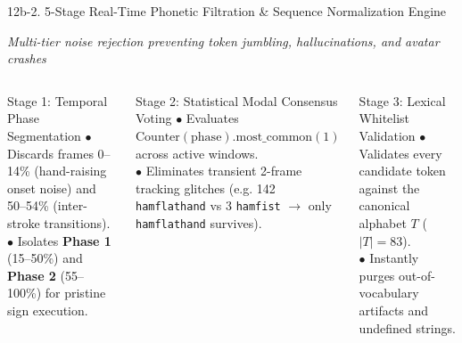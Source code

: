 \documentclass[aspectratio=169,xcolor={table,dvipsnames}]{beamer}
\begin{document}
\begin{frame}[t]{12b-2. 5-Stage Real-Time Phonetic Filtration \& Sequence Normalization Engine}
\vspace{-0.1cm}
\begin{center}
    \scriptsize\textit{\textcolor{amritaMaroon}{Multi-tier noise rejection preventing token jumbling, hallucinations, and avatar crashes}}
\end{center}

\vspace{-1.5mm}
\begin{columns}[T]
    \begin{block}{Stage 1: Temporal Phase Segmentation}
        \fontsize{6.6pt}{8.4pt}\selectfont
        $\bullet$ Discards frames 0--14\% (hand-raising onset noise) and 50--54\% (inter-stroke transitions).\\
        $\bullet$ Isolates \textbf{Phase 1} (15--50\%) and \textbf{Phase 2} (55--100\%) for pristine sign execution.
    \end{block}

    \begin{block}{Stage 2: Statistical Modal Consensus Voting}
        \fontsize{6.6pt}{8.4pt}\selectfont
        $\bullet$ Evaluates $\text{Counter}(\text{phase}).\text{most\_common}(1)$ across active windows.\\
        $\bullet$ Eliminates transient 2-frame tracking glitches (e.g. 142 \texttt{hamflathand} vs 3 \texttt{hamfist} $\to$ only \texttt{hamflathand} survives).
    \end{block}

    \begin{block}{Stage 3: Lexical Whitelist Validation}
        \fontsize{6.6pt}{8.4pt}\selectfont
        $\bullet$ Validates every candidate token against the canonical alphabet $T$ ($|T|=83$).\\
        $\bullet$ Instantly purges out-of-vocabulary artifacts and undefined strings.
    \end{block}


\end{columns}
\end{frame}
\end{document}
